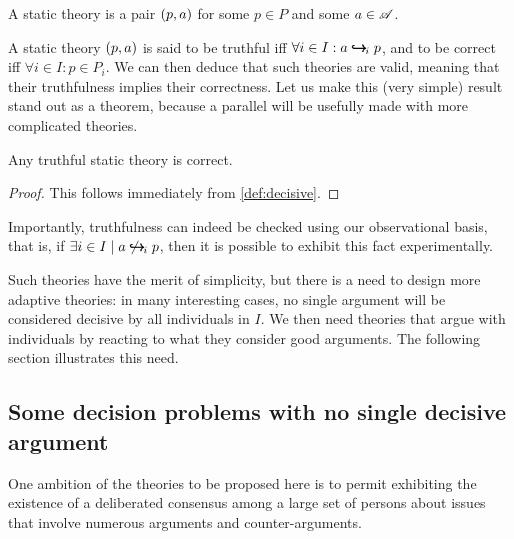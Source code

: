\documentclass[version=last, pagesize, twoside=off, bibliography=totoc, DIV=calc, fontsize=12pt, a4paper, french, english]{scrartcl}
\begin{document}
  \begin{definition}
    \label{def:static}
    A static theory is a pair $(p, \ar)$ for some $p \in P$ and some $\ar \in \allargs$.
  \end{definition}
  A static theory $(p, \ar)$ is said to be truthful iff $\forall i \in I: \ar \ileadstost p$, and to be correct iff $\forall i \in I: p \in P_i$.
  We can then deduce that such theories are valid, meaning that their truthfulness implies their correctness. Let us make this (very simple) result stand out as a theorem, because a parallel will be usefully made with more complicated theories.
  \begin{theorem}
    Any truthful static theory is correct.
  \end{theorem}
  \begin{proof}
    This follows immediately from \cref{def:decisive}.
  \end{proof}
  Importantly, truthfulness can indeed be checked using our observational basis, that is, if $\exists i \in I \suchthat \ar \nileadstost p$, then it is possible to exhibit this fact experimentally.

  Such theories have the merit of simplicity, but there is a need to design more adaptive theories: in many interesting cases, no single argument will be considered decisive by all individuals in $I$. We then need theories that argue with individuals by reacting to what they consider good arguments. The following section illustrates this need.

  \subsection{Some decision problems with no single decisive argument}
  \label{sec:lichtenstein}
  One ambition of the theories to be proposed here is to permit exhibiting the existence of a deliberated consensus among a large set of persons about issues that involve numerous arguments and counter-arguments.
\end{document}
